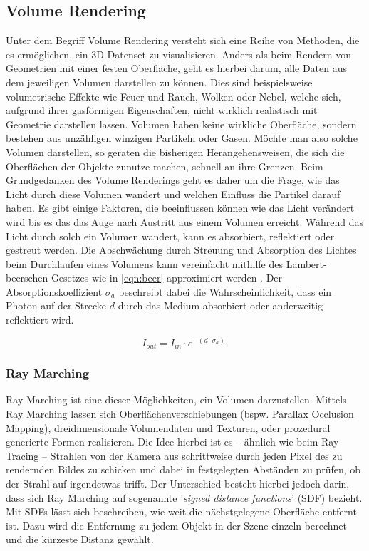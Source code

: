 \subsection{Volume Rendering}

Unter dem Begriff Volume Rendering versteht sich eine Reihe von Methoden, die es ermöglichen, ein 3D-Datenset zu visualisieren.
Anders als beim Rendern von Geometrien mit einer festen Oberfläche, geht es hierbei darum, alle Daten aus
dem jeweiligen Volumen darstellen zu können. Dies sind beispielsweise volumetrische Effekte wie Feuer und Rauch, Wolken oder Nebel,
welche sich, aufgrund ihrer gasförmigen Eigenschaften, nicht wirklich realistisch mit Geometrie darstellen lassen.
Volumen haben keine wirkliche Oberfläche, sondern bestehen aus unzähligen winzigen Partikeln oder Gasen.
Möchte man also solche Volumen darstellen, so geraten die bisherigen Herangehensweisen, die sich die Oberflächen der Objekte zunutze machen,
schnell an ihre Grenzen. Beim Grundgedanken des Volume Renderings geht es daher um die Frage, wie das Licht durch diese Volumen
wandert und welchen Einfluss die Partikel darauf haben.
Es gibt einige Faktoren, die beeinflussen können wie das Licht verändert wird bis es das das Auge nach Austritt aus einem Volumen erreicht.
Während das Licht durch solch ein Volumen wandert, kann es absorbiert, reflektiert oder gestreut werden.
Die Abschwächung durch Streuung und Absorption des Lichtes beim Durchlaufen eines Volumens kann vereinfacht mithilfe des Lambert-beerschen Gesetzes wie in \autoref{eqn:beer}
approximiert werden \parencite{Mayerhofer2020}.
Der Absorptionskoeffizient $\sigma_a$ beschreibt dabei die Wahrscheinlichkeit, dass ein Photon auf der Strecke $d$ durch das Medium absorbiert oder anderweitig
reflektiert wird.

\vspace{-0.5cm  }
\begin{equation}
	\label{eqn:beer}
	I_{out} = I_{in} \cdot e^{- ( d \cdot\sigma_a  )}.
\end{equation}





\subsubsection{Ray Marching}

Ray Marching ist eine dieser Möglichkeiten, ein Volumen darzustellen. Mittels Ray Marching lassen sich Oberflächenverschiebungen (bspw. Parallax Occlusion Mapping),
dreidimensionale Volumendaten und Texturen, oder prozedural generierte Formen realisieren. Die Idee hierbei ist es – ähnlich wie beim Ray Tracing –
Strahlen von der Kamera aus schrittweise durch jeden Pixel des zu rendernden Bildes zu schicken und dabei in festgelegten Abständen zu prüfen,
ob der Strahl auf irgendetwas trifft.
Der Unterschied besteht hierbei jedoch darin, dass sich Ray Marching auf sogenannte '\textit{signed distance functions}' (SDF) bezieht.
Mit SDFs lässt sich beschreiben, wie weit die nächstgelegene Oberfläche entfernt ist. Dazu wird die Entfernung zu jedem Objekt
in der Szene einzeln berechnet und die kürzeste Distanz gewählt.

